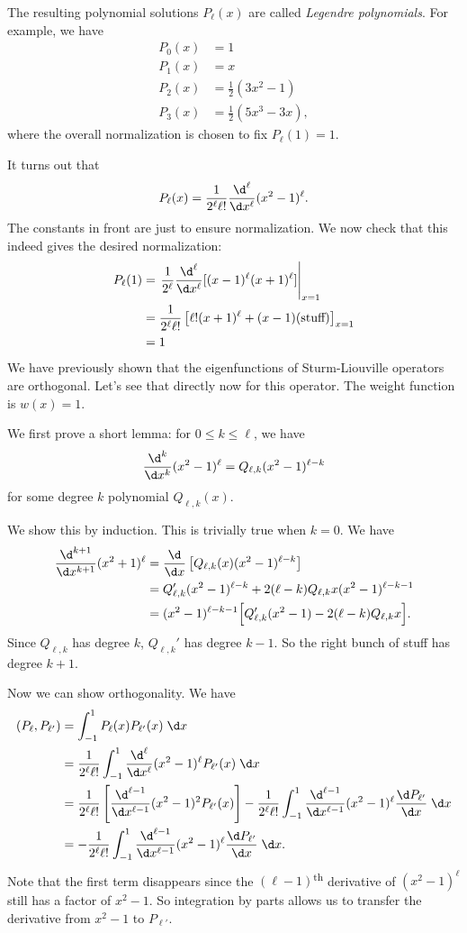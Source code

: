 \documentclass[a4paper]{article}
\begin{document}
The resulting polynomial solutions $P_\ell(x)$ are called \emph{Legendre polynomials}. For example, we have
\begin{align*}
  P_0(x) &= 1\\
  P_1(x) &= x\\
  P_2(x) &= \frac{1}{2}(3x^2 - 1)\\
  P_3(x) &= \frac{1}{2}(5x^3 - 3x),
\end{align*}
where the overall normalization is chosen to fix $P_\ell(1) = 1$.

It turns out that
\[
  P_\ell(x) = \frac{1}{2^\ell \ell!} \frac{\d^\ell}{\d x^\ell} (x^2 - 1)^\ell.
\]
The constants in front are just to ensure normalization. We now check that this indeed gives the desired normalization:
\begin{align*}
  P_\ell(1) &= \left.\frac{1}{2^\ell} \frac{\d^\ell}{\d x^\ell}[(x - 1)^\ell (x + 1)^\ell]\right|_{x = 1}\\
  &= \frac{1}{2^\ell \ell!} \left[\ell!(x + 1)^\ell + (x - 1)(\text{stuff})\right]_{x = 1}\\
  &= 1
\end{align*}
We have previously shown that the eigenfunctions of Sturm-Liouville operators are orthogonal. Let's see that directly now for this operator. The weight function is $w(x) = 1$.

We first prove a short lemma: for $0 \leq k \leq \ell$, we have
\[
  \frac{\d^k}{\d x^k}(x^2 - 1)^\ell = Q_{\ell, k}(x^2 - 1)^{\ell - k}
\]
for some degree $k$ polynomial $Q_{\ell, k}(x)$.

We show this by induction. This is trivially true when $k = 0$. We have
\begin{align*}
  \frac{\d^{k + 1}}{\d x^{k + 1}} (x^2 + 1)^\ell &= \frac{\d}{\d x}\left[Q_{\ell, k}(x) (x^2 - 1)^{\ell - k}\right] \\
  &= Q_{\ell, k}' (x^2 - 1)^{\ell - k} + 2(\ell - k)Q_{\ell, k} x(x^2 - 1)^{\ell - k - 1}\\
  &= (x^2 - 1)^{\ell - k - 1}\Big[Q_{\ell, k}'(x^2 - 1) - 2(\ell - k)Q_{\ell, k} x\Big].
\end{align*}
Since $Q_{\ell, k}$ has degree $k$, $Q_{\ell, k}'$ has degree $k - 1$. So the right bunch of stuff has degree $k + 1$.

Now we can show orthogonality. We have
\begin{align*}
  (P_\ell, P_{\ell'}) &= \int_{-1}^1 P_\ell(x) P_{\ell'}(x) \;\d x\\
  &= \frac{1}{2^\ell \ell!}\int_{-1}^1 \frac{\d^\ell}{\d x^\ell} (x^2 - 1)^\ell P_{\ell'}(x)\;\d x\\
  &= \frac{1}{2^\ell \ell!}\left[\frac{\d^{\ell - 1}}{\d x^{\ell - 1}} (x^2 - 1)^2 P_{\ell'}(x)\right] - \frac{1}{2^\ell \ell!} \int_{-1}^1 \frac{\d^{\ell - 1}}{\d x^{\ell - 1}}(x^2 - 1)^\ell \frac{\d P_{\ell'}}{\d x}\;\d x\\
  &= - \frac{1}{2^\ell \ell!} \int_{-1}^1 \frac{\d^{\ell - 1}}{\d x^{\ell - 1}}(x^2 - 1)^\ell \frac{\d P_{\ell'}}{\d x}\;\d x.
\end{align*}
Note that the first term disappears since the $(\ell - 1)$\textsuperscript{th} derivative of $(x^2 - 1)^\ell$ still has a factor of $x^2 - 1$. So integration by parts allows us to transfer the derivative from $x^2 - 1$ to $P_{\ell'}$.
\end{document}
